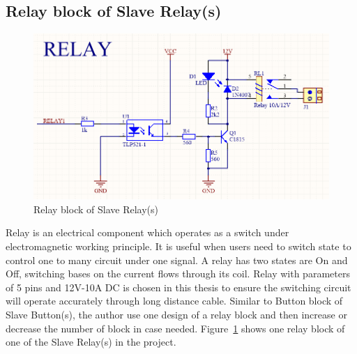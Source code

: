   \subsection{Relay block of Slave Relay(s)}
  \begin{figure}[!ht]
    \begin{center}
    \includegraphics[scale=0.65]{images/relay.png}
    \caption{Relay block of Slave Relay(s)}
    \label{fig:relayBlock}
    \end{center}
  \end{figure}
  Relay is an electrical component which operates as a switch under electromagnetic working principle. It is useful when users need to switch state to control one to many circuit under one signal. A relay has two states are On and Off, switching bases on the current flows through its coil. Relay with parameters of 5 pins and 12V-10A DC is chosen in this thesis to ensure the switching circuit will operate accurately through long distance cable. Similar to Button block of Slave Button(s), the author use one design of a relay block and then increase or decrease the number of block in case needed. Figure~\ref{fig:relayBlock} shows one relay block of one of the Slave Relay(s) in the project.

  
